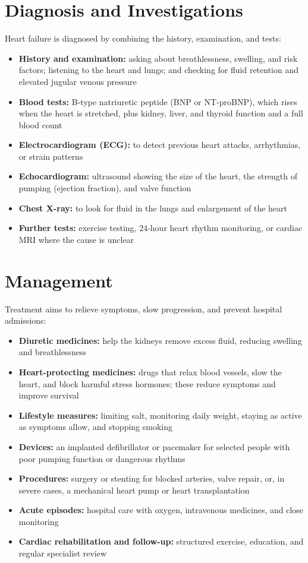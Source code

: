 \section*{Diagnosis and Investigations}
Heart failure is diagnosed by combining the history, examination, and tests:
\begin{itemize}
    \item \textbf{History and examination:} asking about breathlessness, swelling, and risk factors; listening to the heart and lungs; and checking for fluid retention and elevated jugular venous pressure
    \item \textbf{Blood tests:} B-type natriuretic peptide (BNP or NT-proBNP), which rises when the heart is stretched, plus kidney, liver, and thyroid function and a full blood count
    \item \textbf{Electrocardiogram (ECG):} to detect previous heart attacks, arrhythmias, or strain patterns
    \item \textbf{Echocardiogram:} ultrasound showing the size of the heart, the strength of pumping (ejection fraction), and valve function
    \item \textbf{Chest X-ray:} to look for fluid in the lungs and enlargement of the heart
    \item \textbf{Further tests:} exercise testing, 24-hour heart rhythm monitoring, or cardiac MRI where the cause is unclear
\end{itemize}

\section*{Management}
Treatment aims to relieve symptoms, slow progression, and prevent hospital admissions:
\begin{itemize}
    \item \textbf{Diuretic medicines:} help the kidneys remove excess fluid, reducing swelling and breathlessness
    \item \textbf{Heart-protecting medicines:} drugs that relax blood vessels, slow the heart, and block harmful stress hormones; these reduce symptoms and improve survival
    \item \textbf{Lifestyle measures:} limiting salt, monitoring daily weight, staying as active as symptoms allow, and stopping smoking
    \item \textbf{Devices:} an implanted defibrillator or pacemaker for selected people with poor pumping function or dangerous rhythms
    \item \textbf{Procedures:} surgery or stenting for blocked arteries, valve repair, or, in severe cases, a mechanical heart pump or heart transplantation
    \item \textbf{Acute episodes:} hospital care with oxygen, intravenous medicines, and close monitoring
    \item \textbf{Cardiac rehabilitation and follow-up:} structured exercise, education, and regular specialist review
\end{itemize}

